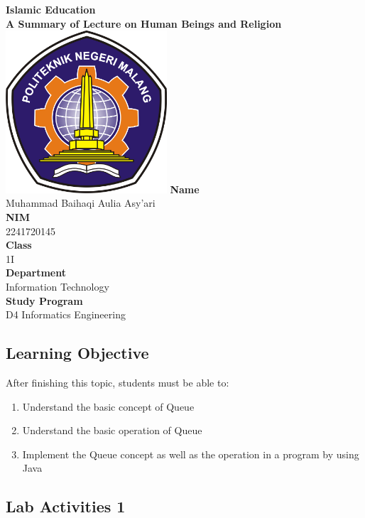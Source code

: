 \documentclass[12pt,titlepage]{article}
\newcommand{\vSubject}{Islamic Education}
\newcommand{\vSubtitle}{A Summary of Lecture on}
\newcommand{\vSubsubtitle}{Human Beings and Religion}
\newcommand{\vName}{Muhammad Baihaqi Aulia Asy'ari}
\newcommand{\vNIM}{2241720145}
\newcommand{\vClass}{1I}
\newcommand{\vDepartment}{Information Technology}
\newcommand{\vStudyProgram}{D4 Informatics Engineering}
\begin{document}
\begin{titlepage}
    \centering
    \vfill
    {\bfseries\LARGE
        \vSubject\\
        \vskip0.25cm
        \vSubtitle
        \vskip0.25cm
        \vSubsubtitle
    }
    \vfill
    \includegraphics[width=6cm]{images/polinema-logo.png}
    \vfill
    {
        \textbf{Name}\\
        \vName\\
        \vskip0.5cm
        \textbf{NIM}\\
        \vNIM\\
        \vskip0.5cm
        \textbf{Class}\\
        \vClass\\
        \vskip0.5cm
        \textbf{Department}\\
        \vDepartment\\
        \vskip0.5cm
        \textbf{Study Program}\\
        \vStudyProgram
    }
\end{titlepage}

\newpage

\setcounter{section}{1}
\subsection{Learning Objective}
After finishing this topic, students must be able to:
\begin{enumerate}
    \item Understand the basic concept of Queue
    \item Understand the basic operation of Queue
    \item Implement the Queue concept as well as the operation in a program by using Java
\end{enumerate}

\subsection{Lab Activities 1}
\end{document}

